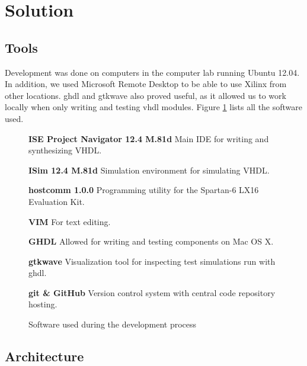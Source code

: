 \section{Solution}


\subsection{Tools}

Development was done on computers in the computer lab running Ubuntu 12.04.
In addition, we used Microsoft Remote Desktop to be able to use Xilinx from other locations.
ghdl and gtkwave also proved useful, as it allowed us to work locally when only writing and testing vhdl modules. Figure \ref{fig:software} lists all the software used.

\begin{figure}[ht!]
    \begin{description}
        \item{\textbf{ISE Project Navigator 12.4 M.81d}}
            Main IDE for writing and synthesizing VHDL.
        \item{\textbf{ISim 12.4 M.81d}}
            Simulation environment for simulating VHDL.
        \item{\textbf{hostcomm 1.0.0}}
            Programming utility for the Spartan-6 LX16 Evaluation Kit.
        \item{\textbf{VIM}}
            For text editing.
        \item{\textbf{GHDL}}
            Allowed for writing and testing components on Mac OS X.
        \item{\textbf{gtkwave}}
            Visualization tool for inspecting test simulations run with ghdl.
        \item{\textbf{git \& GitHub}}
            Version control system with central code repository hosting.
    \label{fig:software}
    \end{description}
    \caption{Software used during the development process}
\end{figure}

\subsection{Architecture}

